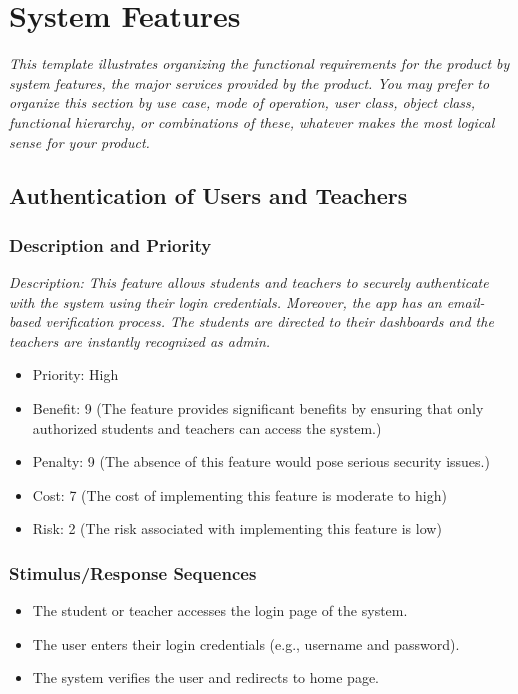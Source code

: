 \documentclass{article}
\begin{document}
\section{System Features}
\emph{This template illustrates organizing the functional requirements for the product by system features, the major services provided by the product. You may prefer to organize this section by use case, mode of operation, user class, object class, functional hierarchy, or combinations of these, whatever makes the most logical sense for your product.}




\subsection{Authentication of Users and Teachers}
\subsubsection{Description and Priority}
\emph{Description: This feature allows students and teachers to securely authenticate with the system using their login credentials. Moreover, the app has an email-based verification process. The students are directed to their dashboards and the teachers are instantly recognized as admin.}
\begin{itemize}
  \item Priority: High
  \item Benefit: 9 (The feature provides significant benefits by ensuring that only authorized students and teachers can access the system.)
  \item Penalty: 9 (The absence of this feature would pose serious security issues.)
  \item Cost: 7 (The cost of implementing this feature is moderate to high)
  \item Risk: 2 (The risk associated with implementing this feature is low)
\end{itemize}

\subsubsection{Stimulus/Response Sequences}
\begin{itemize}
  \item The student or teacher accesses the login page of the system.
  \item The user enters their login credentials (e.g., username and password).
  \item The system verifies the user and redirects to home page.
\end{itemize}
\end{document}
